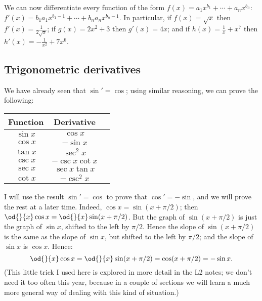 \begin{ex}
  We can now differentiate every function of the form $ f(x) = a_1 x^{b_1} + \cdots + a_n x^{b_n} $: $ f'(x) = b_1 a_1 x^{b_1 - 1} + \cdots + b_n a_n x^{b_n - 1} $.
  In particular, if $ f(x) = \sqrt{x} $ then $ f'(x) = \frac{1}{2\sqrt{x}} $; if $ g(x) = 2x^2 + 3 $ then $ g'(x) = 4x $; and if $ h(x) = \frac{1}{x} + x^7 $
  then $ h'(x) = -\frac{1}{x^2} + 7x^6 $.
\end{ex}

\subsection{Trigonometric derivatives}
We have already seen that $ \sin' = \cos $; using similar reasoning, we can prove the following:
\begin{thm}
  \def\arraystretch{1.5}
  \begin{tabular}{|c|c|l|}\hline
    \textbf{Function} & \textbf{Derivative} \\\hline
    $ \sin x $ & $ \cos x $\\\hline
    $ \cos x $ & $ -\sin x $\\\hline
    $ \tan x $ & $ \sec^2 x $\\\hline
    $ \csc x $ & $ -\csc x \cot x $\\\hline
    $ \sec x $ & $ \sec x \tan x $\\\hline
    $ \cot x $ & $ -\csc^2 x $\\\hline
  \end{tabular}
\end{thm}

I will use the result $ \sin' = \cos $ to prove that $ \cos' = -\sin $, and we will prove
the rest at a later time. Indeed, $ \cos x = \sin (x + \pi/2) $; then $ \od{}{x} \cos x = \od{}{x} \sin(x + \pi/2) $.
But the graph of $ \sin(x + \pi/2) $ is just the graph of $ \sin x $, shifted to the left
by $ \pi/2 $. Hence the slope of $ \sin (x + \pi/2) $ is the same as the slope of $ \sin x $,
but shifted to the left by $ \pi/2 $; and the slope of $ \sin x $ is $ \cos x $. Hence:
\begin{equation}
  \od{}{x} \cos x = \od{}{x} \sin(x + \pi/2) = \cos(x + \pi/2) = -\sin x.
\end{equation}
(This little trick I used here is explored in more detail in the L2 notes; we don't need it
too often this year, because in a couple of sections we will learn a much more general way
of dealing with this kind of situation.)

